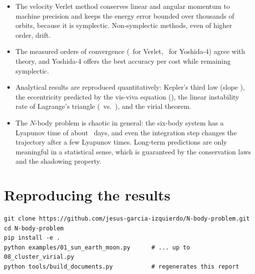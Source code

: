 \documentclass[11pt,a4paper]{article}
\begin{document}
\begin{itemize}
  \item The velocity Verlet method conserves linear and angular momentum to machine
        precision and keeps the energy error bounded over thousands of orbits, because it
        is symplectic. Non-symplectic methods, even of higher order, drift.
  \item The measured orders of convergence (\OrderVerlet\ for Verlet, \OrderYoshida\ for
        Yoshida-4) agree with theory, and Yoshida-4 offers the best accuracy per cost while
        remaining symplectic.
  \item Analytical results are reproduced quantitatively: Kepler's third law (slope
        \SolarSlope), the eccentricity predicted by the vis-viva equation (\FourEcc), the
        linear instability rate of Lagrange's triangle (\LagSigma\ vs.\ \LagSigmaTh), and
        the virial theorem.
  \item The $N$-body problem is chaotic in general: the six-body system has a Lyapunov
        time of about \ChaosLyapDays\ days, and even the integration step changes the
        trajectory after a few Lyapunov times. Long-term predictions are only meaningful in
        a statistical sense, which is guaranteed by the conservation laws and the
        shadowing property.
\end{itemize}

\appendix
\section{Reproducing the results}

\begin{verbatim}
git clone https://github.com/jesus-garcia-izquierdo/N-body-problem.git
cd N-body-problem
pip install -e .
python examples/01_sun_earth_moon.py      # ... up to 08_cluster_virial.py
python tools/build_documents.py           # regenerates this report
\end{verbatim}
\end{document}
